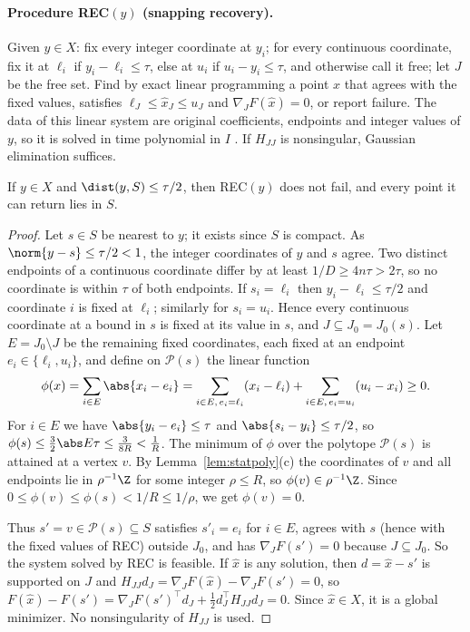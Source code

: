 \paragraph{Procedure REC$(y)$ (snapping recovery).}
Given $y\in X$: fix every integer coordinate at $y_i$; for every continuous
coordinate, fix it at $\ell_i$ if $y_i-\ell_i\le\tau$, else at $u_i$ if
$u_i-y_i\le\tau$, and otherwise call it free; let $J$ be the free set. Find
by exact linear programming a point $\hat x$ that agrees with the fixed
values, satisfies $\ell_J\le\hat x_J\le u_J$ and $\nabla_JF(\hat x)=0$, or
report failure. The data of this linear system are original coefficients,
endpoints and integer values of $y$, so it is solved in time polynomial in
$I$ \cite[Theorem~6.4.12]{GrotschelLovaszSchrijver1988}. If $H_{JJ}$ is
nonsingular, Gaussian elimination suffices.

\begin{lemma}\label{lem:snap}
If $y\in X$ and $\dist(y,S)\le\tau/2$, then REC$(y)$ does not fail, and every
point it can return lies in $S$.
\end{lemma}

\begin{proof}
Let $s\in S$ be nearest to $y$; it exists since $S$ is compact. As
$\norm{y-s}\le\tau/2<1$, the integer coordinates of $y$ and $s$ agree. Two
distinct endpoints of a continuous coordinate differ by at least
$1/D\ge4n\tau>2\tau$, so no coordinate is within $\tau$ of both endpoints. If
$s_i=\ell_i$ then $y_i-\ell_i\le\tau/2$ and coordinate $i$ is fixed at
$\ell_i$; similarly for $s_i=u_i$. Hence every continuous coordinate at a
bound in $s$ is fixed at its value in $s$, and $J\subseteq J_0=J_0(s)$. Let
$E=J_0\setminus J$ be the remaining fixed coordinates, each fixed at an
endpoint $e_i\in\{\ell_i,u_i\}$, and define on $\mathcal P(s)$ the linear
function
\[
\phi(x)=\sum_{i\in E}\abs{x_i-e_i}
=\sum_{i\in E,\,e_i=\ell_i}(x_i-\ell_i)+\sum_{i\in E,\,e_i=u_i}(u_i-x_i)\ge0 .
\]
For $i\in E$ we have $\abs{y_i-e_i}\le\tau$ and $\abs{s_i-y_i}\le\tau/2$, so
$\phi(s)\le\frac32\abs E\tau\le\frac3{8R}<\frac1R$. The minimum of $\phi$
over the polytope $\mathcal P(s)$ is attained at a vertex $v$. By
Lemma~\ref{lem:statpoly}(c) the coordinates of $v$ and all endpoints lie in
$\rho^{-1}\Z$ for some integer $\rho\le R$, so $\phi(v)\in\rho^{-1}\Z$.
Since $0\le\phi(v)\le\phi(s)<1/R\le1/\rho$, we get $\phi(v)=0$.

Thus $s'=v\in\mathcal P(s)\subseteq S$ satisfies $s'_i=e_i$ for $i\in E$,
agrees with $s$ (hence with the fixed values of REC) outside $J_0$, and has
$\nabla_JF(s')=0$ because $J\subseteq J_0$. So the system solved by REC is
feasible. If $\hat x$ is any solution, then $d=\hat x-s'$ is supported on
$J$ and $H_{JJ}d_J=\nabla_JF(\hat x)-\nabla_JF(s')=0$, so
$F(\hat x)-F(s')=\nabla_JF(s')^{\top}d_J+\frac12d_J^{\top}H_{JJ}d_J=0$.
Since $\hat x\in X$, it is a global minimizer. No nonsingularity of $H_{JJ}$
is used.
\end{proof}

